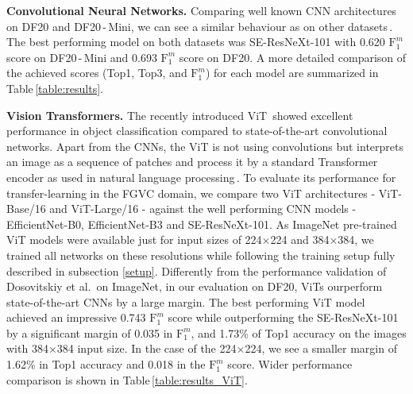 \documentclass[10pt,twocolumn,letterpaper]{article}
\begin{document}
\textbf{Convolutional Neural Networks.} 
Comparing well known CNN architectures on DF20 and DF20\,-\,Mini, we can see a similar behaviour as on other datasets\,\cite{imagenet, inaturalist2017, dataset-CUBS}. The best performing model on both datasets was SE-ResNeXt-101 with 0.620 $\text{F}_{1}^{m}$ score on DF20\,-\,Mini and 0.693 $\text{F}_{1}^{m}$ score on DF20. A more detailed comparison of the achieved scores (Top1, Top3, and $\text{F}_{1}^{m}$) for each model are summarized in Table\,\ref{table:results}. 

\textbf{Vision Transformers.}
The recently introduced ViT\,\cite{vit} showed excellent performance in object classification compared to state-of-the-art convolutional networks. Apart from the CNNs, the ViT is not using convolutions but interprets an image as a sequence of patches and process it by a standard Transformer encoder as used in  natural language processing\,\cite{vaswani2017attention}.
To evaluate its performance for transfer-learning in the FGVC domain, we compare two ViT architectures - ViT-Base/16 and ViT-Large/16 - against the well performing CNN models - EfficientNet-B0, EfficientNet-B3 and SE-ResNeXt-101. As ImageNet pre-trained ViT models were available just for input sizes of 224$\times$224 and 384$\times$384, we trained all networks on these resolutions while following the training setup fully described in subsection \ref{setup}. Differently from the performance validation of Dosovitskiy et al.\,\cite{vit} on ImageNet, in our evaluation on DF20, ViTs ourperform state-of-the-art CNNs by a large margin. The best performing ViT model achieved an impressive 0.743 $\text{F}_{1}^{m}$ score while outperforming the SE-ResNeXt-101 by a significant margin of 0.035 in $\text{F}_{1}^{m}$, and 1.73\% of Top1 accuracy on the images with 384$\times$384 input size. In the case of the  224$\times$224, we see a smaller margin of 1.62\% in Top1 accuracy and 0.018 in the  $\text{F}_{1}^{m}$ score. Wider performance comparison is shown in Table\,\ref{table:results_ViT}.
\end{document}
